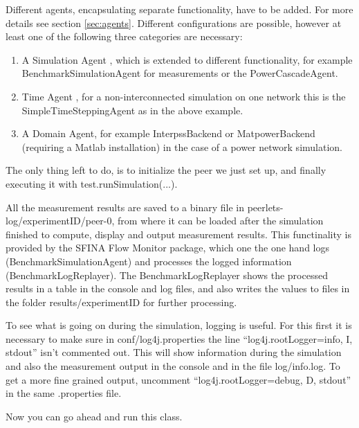 \documentclass[11pt,fleqn]{book} %
\newcommand{\MainAgent}{Simulation Agent }
\newcommand{\TimeAgent}{Time Agent }
\newcommand{\DomainAgent}{Domain Agent} %
\newcommand{\InterpssDomainAgent}{InterpssBackend}
\newcommand{\MatpowerDomainAgent}{MatpowerBackend}
\newcommand{\BenchmarkAgent}{BenchmarkSimulationAgent}
\newcommand{\BenchmarkLogReplayer}{BenchmarkLogReplayer}
\newcommand{\CascadeAgent}{CascadeAgent}
\begin{document}
Different agents, encapsulating separate functionality, have to be added. For more details see section \ref{sec:agents}. Different configurations are possible, however at least one of the following three categories are necessary:
\begin{enumerate}
	\item A \MainAgent, which is extended to different functionality, for example \BenchmarkAgent{} for measurements or the Power\CascadeAgent{}.
	\item \TimeAgent, for a non-interconnected simulation on one network this is the SimpleTimeSteppingAgent as in the above example.
	\item A \DomainAgent, for example \InterpssDomainAgent{} or \MatpowerDomainAgent{} (requiring a Matlab installation) in the case of a power network simulation.
\end{enumerate}

The only thing left to do, is to initialize the peer we just set up, and finally executing it with test.runSimulation(...).

All the measurement results are saved to a binary file in peerlets-log/experimentID/peer-0, from where it can be loaded after the simulation finished to compute, display and output measurement results. This functinality is provided by the SFINA Flow Monitor package, which one the one hand logs (BenchmarkSimulationAgent) and processes the logged information (\BenchmarkLogReplayer{}). The \BenchmarkLogReplayer{} shows the processed results in a table in the console and log files, and also writes the values to files in the folder results/experimentID for further processing.

To see what is going on during the simulation, logging is useful. For this first it is necessary to make sure in conf/log4j.properties the line “log4j.rootLogger=info, I, stdout” isn’t commented out. This will show information during the simulation and also the measurement output in the console and in the file log/info.log. To get a more fine grained output, uncomment “log4j.rootLogger=debug, D, stdout” in the same .properties file.

Now you can go ahead and run this class.







\end{document}
